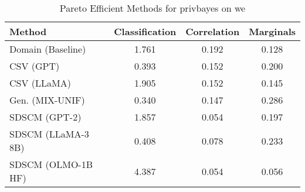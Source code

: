 \begin{table}[t!]
    \centering
    \caption{Pareto Efficient Methods for privbayes on we}
    \label{tab:pareto_efficient_methods_privbayes_we}
    \begin{tabular}{lccc}
    \toprule
    Method & Classification & Correlation & Marginals \\
    \midrule
    Domain (Baseline) & 1.761 & 0.192 & \cellcolor{silver!30}0.128 \\
    CSV (GPT) & \cellcolor{silver!30}0.393 & 0.152 & 0.200 \\
    CSV (LLaMA) & 1.905 & 0.152 & \cellcolor{bronze!30}0.145 \\
    Gen. (MIX-UNIF) & \cellcolor{gold!30}0.340 & 0.147 & 0.286 \\
    SDSCM (GPT-2) & 1.857 & \cellcolor{gold!30}0.054 & 0.197 \\
    SDSCM (LLaMA-3 8B) & \cellcolor{bronze!30}0.408 & \cellcolor{bronze!30}0.078 & 0.233 \\
    SDSCM (OLMO-1B HF) & 4.387 & \cellcolor{silver!30}0.054 & \cellcolor{gold!30}0.056 \\
    \bottomrule
    \end{tabular}
\end{table}